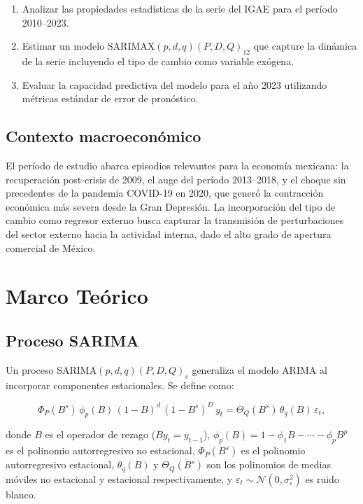 \documentclass[12pt,a4paper]{article}
\begin{document}
\begin{enumerate}[label=\roman*.]
  \item Analizar las propiedades estadísticas de la serie del IGAE para el período 2010--2023.
  \item Estimar un modelo SARIMAX$(p,d,q)(P,D,Q)_{12}$ que capture la dinámica de la serie incluyendo el tipo de cambio como variable exógena.
  \item Evaluar la capacidad predictiva del modelo para el año 2023 utilizando métricas estándar de error de pronóstico.
\end{enumerate}

\subsection{Contexto macroeconómico}

El período de estudio abarca episodios relevantes para la economía mexicana: la recuperación post-crisis de 2009, el auge del período 2013--2018, y el choque sin precedentes de la pandemia COVID-19 en 2020, que generó la contracción económica más severa desde la Gran Depresión. La incorporación del tipo de cambio como regresor externo busca capturar la transmisión de perturbaciones del sector externo hacia la actividad interna, dado el alto grado de apertura comercial de México.

\section{Marco Teórico}

\subsection{Proceso SARIMA}

Un proceso SARIMA$(p,d,q)(P,D,Q)_s$ generaliza el modelo ARIMA al incorporar componentes estacionales. Se define como:

\begin{equation}
  \Phi_P(B^s)\,\phi_p(B)\,(1-B)^d\,(1-B^s)^D\, y_t = \Theta_Q(B^s)\,\theta_q(B)\,\varepsilon_t,
  \label{eq:sarima}
\end{equation}

donde $B$ es el operador de rezago ($By_t = y_{t-1}$), $\phi_p(B) = 1 - \phi_1 B - \cdots - \phi_p B^p$ es el polinomio autorregresivo no estacional, $\Phi_P(B^s)$ es el polinomio autorregresivo estacional, $\theta_q(B)$ y $\Theta_Q(B^s)$ son los polinomios de medias móviles no estacional y estacional respectivamente, y $\varepsilon_t \sim \mathcal{N}(0,\sigma^2_\varepsilon)$ es ruido blanco.
\end{document}
